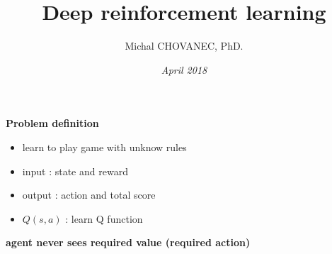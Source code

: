 \documentclass[xcolor=dvipsnames]{beamer}
\title{\bf Deep reinforcement learning}
\author{Michal CHOVANEC, PhD.}
\date[EURP]{\it April 2018}
\begin{document}
\begin{frame}
\titlepage
{}
\end{frame}


\begin{frame}{\bf Problem definition}
\begin{itemize}
 \item learn to play game with unknow rules
 \item input  : state and reward
 \item output : action and total score
 \item $Q(s, a)$ : learn Q function
\end{itemize}
\centering

{\color{red} \bf agent never sees required value (required action)}



\end{frame}
\end{document}
